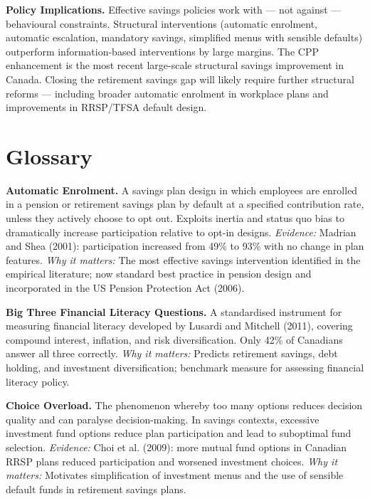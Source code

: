 \documentclass[12pt, letterpaper]{article}
\begin{document}
\textbf{Policy Implications.} Effective savings policies work with --- not against --- behavioural constraints. Structural interventions (automatic enrolment, automatic escalation, mandatory savings, simplified menus with sensible defaults) outperform information-based interventions by large margins. The CPP enhancement is the most recent large-scale structural savings improvement in Canada. Closing the retirement savings gap will likely require further structural reforms --- including broader automatic enrolment in workplace plans and improvements in RRSP/TFSA default design.

\medskip


\section*{Glossary}


\textbf{Automatic Enrolment.} A savings plan design in which employees are enrolled in a pension or retirement savings plan by default at a specified contribution rate, unless they actively choose to opt out. Exploits inertia and status quo bias to dramatically increase participation relative to opt-in designs. \textit{Evidence:} Madrian and Shea (2001): participation increased from 49\% to 93\% with no change in plan features. \textit{Why it matters:} The most effective savings intervention identified in the empirical literature; now standard best practice in pension design and incorporated in the US Pension Protection Act (2006).

\textbf{Big Three Financial Literacy Questions.} A standardised instrument for measuring financial literacy developed by Lusardi and Mitchell (2011), covering compound interest, inflation, and risk diversification. Only 42\% of Canadians answer all three correctly. \textit{Why it matters:} Predicts retirement savings, debt holding, and investment diversification; benchmark measure for assessing financial literacy policy.

\textbf{Choice Overload.} The phenomenon whereby too many options reduces decision quality and can paralyse decision-making. In savings contexts, excessive investment fund options reduce plan participation and lead to suboptimal fund selection. \textit{Evidence:} Choi et al. (2009): more mutual fund options in Canadian RRSP plans reduced participation and worsened investment choices. \textit{Why it matters:} Motivates simplification of investment menus and the use of sensible default funds in retirement savings plans.
\end{document}
